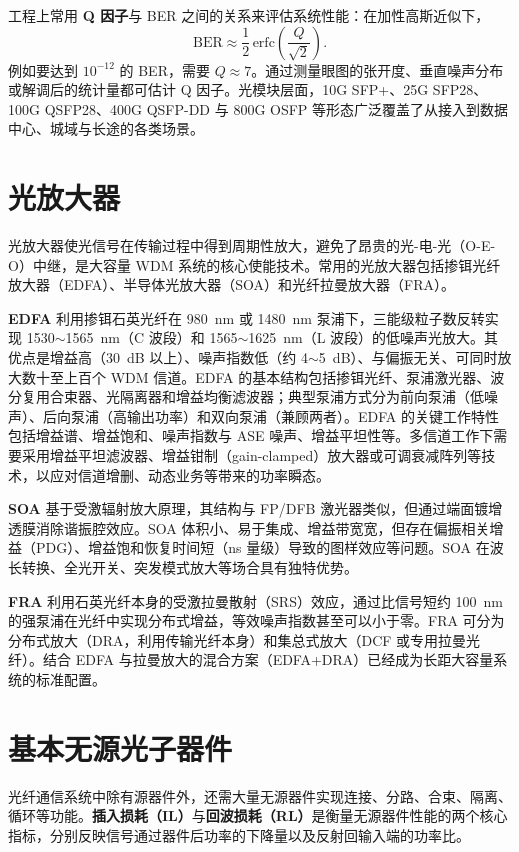 \documentclass[a4paper,11pt,UTF8,fontset=fandol]{ctexart}
\begin{document}
工程上常用 \textbf{Q 因子}与 BER 之间的关系来评估系统性能：在加性高斯近似下，
\begin{equation}
\mathrm{BER} \approx \frac{1}{2}\,\mathrm{erfc}\!\left(\frac{Q}{\sqrt{2}}\right).
\end{equation}
例如要达到 $10^{-12}$ 的 BER，需要 $Q \approx 7$。通过测量眼图的张开度、垂直噪声分布或解调后的统计量都可估计 Q 因子。光模块层面，10G SFP+、25G SFP28、100G QSFP28、400G QSFP-DD 与 800G OSFP 等形态广泛覆盖了从接入到数据中心、城域与长途的各类场景。

\section{光放大器}

光放大器使光信号在传输过程中得到周期性放大，避免了昂贵的光-电-光（O-E-O）中继，是大容量 WDM 系统的核心使能技术\cite{becker1999edfa}。常用的光放大器包括掺铒光纤放大器（EDFA）、半导体光放大器（SOA）和光纤拉曼放大器（FRA）。

\textbf{EDFA} 利用掺铒石英光纤在 980~nm 或 1480~nm 泵浦下，三能级粒子数反转实现 1530$\sim$1565~nm（C 波段）和 1565$\sim$1625~nm（L 波段）的低噪声光放大。其优点是增益高（30~dB 以上）、噪声指数低（约 4$\sim$5~dB）、与偏振无关、可同时放大数十至上百个 WDM 信道。EDFA 的基本结构包括掺铒光纤、泵浦激光器、波分复用合束器、光隔离器和增益均衡滤波器；典型泵浦方式分为前向泵浦（低噪声）、后向泵浦（高输出功率）和双向泵浦（兼顾两者）。EDFA 的关键工作特性包括增益谱、增益饱和、噪声指数与 ASE 噪声、增益平坦性等。多信道工作下需要采用增益平坦滤波器、增益钳制（gain-clamped）放大器或可调衰减阵列等技术，以应对信道增删、动态业务等带来的功率瞬态。

\textbf{SOA} 基于受激辐射放大原理，其结构与 FP/DFB 激光器类似，但通过端面镀增透膜消除谐振腔效应。SOA 体积小、易于集成、增益带宽宽，但存在偏振相关增益（PDG）、增益饱和恢复时间短（ns 量级）导致的图样效应等问题。SOA 在波长转换、全光开关、突发模式放大等场合具有独特优势。

\textbf{FRA} 利用石英光纤本身的受激拉曼散射（SRS）效应，通过比信号短约 100~nm 的强泵浦在光纤中实现分布式增益，等效噪声指数甚至可以小于零。FRA 可分为分布式放大（DRA，利用传输光纤本身）和集总式放大（DCF 或专用拉曼光纤）。结合 EDFA 与拉曼放大的混合方案（EDFA+DRA）已经成为长距大容量系统的标准配置。

\section{基本无源光子器件}

光纤通信系统中除有源器件外，还需大量无源器件实现连接、分路、合束、隔离、循环等功能\cite{yuanrong2020}。\textbf{插入损耗（IL）}与\textbf{回波损耗（RL）}是衡量无源器件性能的两个核心指标，分别反映信号通过器件后功率的下降量以及反射回输入端的功率比。
\end{document}
